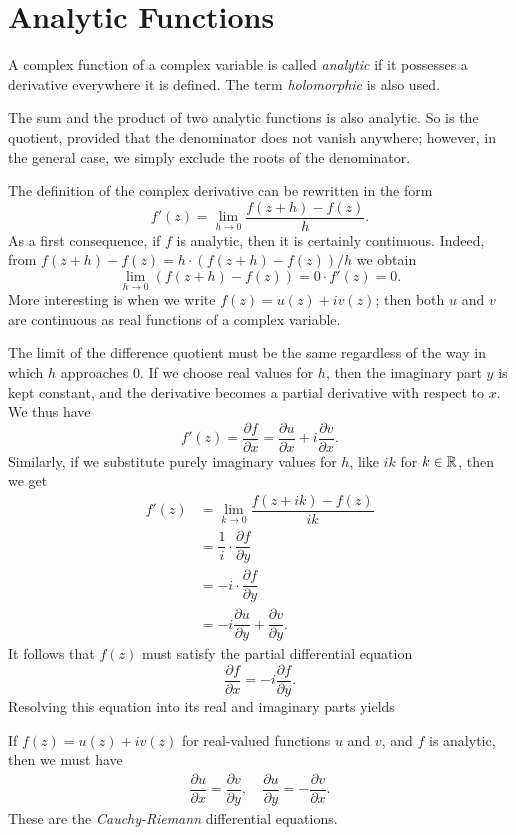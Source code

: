 \section{Analytic Functions}
\begin{definition}
	A complex function of a complex variable is called \textit{analytic} if it possesses a derivative everywhere it is defined. The term \textit{holomorphic} is also used.
\end{definition}
The sum and the product of two analytic functions is also analytic. So is the quotient, provided that the denominator does not vanish anywhere; however, in the general case, we simply exclude the roots of the denominator.

The definition of the complex derivative can be rewritten in the form $$f'(z)=\lim_{h \rightarrow 0} \dfrac{f(z+h)-f(z)}{h}.$$ As a first consequence, if $f$ is analytic, then it is certainly continuous. Indeed, from $f(z+h)-f(z)=h \cdot (f(z+h)-f(z))/h$ we obtain $$\lim_{h \rightarrow 0}(f(z+h)-f(z))=0 \cdot f'(z)=0.$$ More interesting is when we write $f(z)=u(z)+iv(z)$; then both $u$ and $v$ are continuous as real functions of a complex variable.

The limit of the difference quotient must be the same regardless of the way in which $h$ approaches $0$. If we choose real values for $h$, then the imaginary part $y$ is kept constant, and the derivative becomes a partial derivative with respect to $x$. We thus have $$f'(z)=\dfrac{\partial f}{\partial x}=\dfrac{\partial u}{\partial x}+i \dfrac{\partial v}{\partial x}.$$ Similarly, if we substitute purely imaginary values for $h$, like $ik$ for $k \in \mathbb R$, then we get
\begin{align*}
	f'(z) &=\lim_{k \rightarrow 0} \dfrac{f(z+ik)-f(z)}{ik} \\
	&=\dfrac{1}{i} \cdot \dfrac{\partial f}{\partial y} \\
	&=-i \cdot \dfrac{\partial f}{\partial y} \\
	&=-i \dfrac{\partial u}{\partial y}+\dfrac{\partial v}{\partial y}.
\end{align*}
It follows that $f(z)$ must satisfy the partial differential equation $$\dfrac{\partial f}{\partial x}=-i\dfrac{\partial f}{\partial y}.$$ Resolving this equation into its real and imaginary parts yields
\begin{proposition}
	If $f(z)=u(z)+iv(z)$ for real-valued functions $u$ and $v$, and $f$ is analytic, then we must have 
	\begin{align}
	\dfrac{\partial u}{\partial x}=\dfrac{\partial v}{\partial y}, \quad \dfrac{\partial u}{\partial y}=-\dfrac{\partial v}{\partial x}.
	\end{align}
	These are the \textit{Cauchy-Riemann} differential equations.
\end{proposition}

